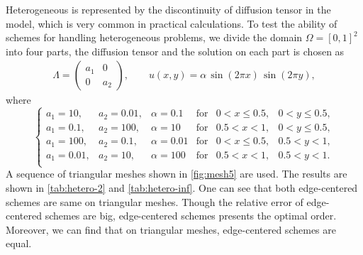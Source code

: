 \documentclass[times,review,preprint,authoryear]{elsarticle}
\begin{document}
Heterogeneous is represented by the discontinuity of diffusion tensor  in the model, which is very common in practical calculations. To test the ability of schemes for handling heterogeneous problems, we divide the domain $\Omega = [0,1]^2$ into four parts, the diffusion tensor and the solution on each part is chosen as
\begin{align*}
\Lambda =
\left(
\begin{matrix}
a_1 & 0 \\
0 & a_2
\end{matrix}
\right),
\qquad
u(x,y) = \alpha \, \sin(2 \pi x) \, \sin(2 \pi y),
\end{align*}
where
\begin{equation*}
\left\{
\begin{array}{llllll}
a_1 = 10, & a_2 = 0.01, & \alpha = 0.1 & \text{for} & 0 < x \leq 0.5, & 0 < y \leq 0.5, \\
a_1 = 0.1, & a_2 = 100, & \alpha = 10 & \text{for} & 0.5 < x < 1, & 0 < y \leq 0.5, \\
a_1 = 100, & a_2 = 0.1, & \alpha = 0.01 & \text{for} & 0 < x \leq 0.5, & 0.5 < y < 1, \\
a_1 = 0.01, & a_2 = 10, & \alpha = 100 & \text{for} & 0.5 < x < 1, & 0.5 < y < 1. \\
\end{array}
\right.
\end{equation*}
A sequence of triangular meshes shown in \cref{fig:mesh5} are used. The results are shown in \cref{tab:hetero-2} and \cref{tab:hetero-inf}. One can see that both edge-centered schemes are same on triangular meshes. Though the relative error of edge-centered schemes are big, edge-centered schemes presents the optimal order. Moreover, we can find that on triangular meshes, edge-centered schemes are equal.
\end{document}
